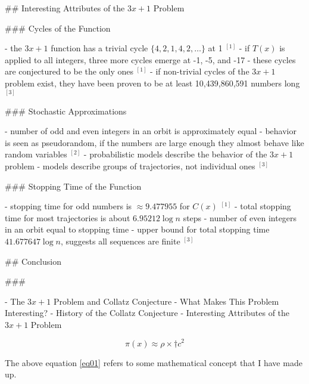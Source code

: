 \documentclass[12pt, a4paper, reqno]{amsart}
\begin{document}
## Interesting Attributes of the $3x+1$ Problem

### Cycles of the Function

- the $3x+1$ function has a trivial cycle $\{4,2,1,4,2,\dots\}$ at 1 $^{[1]}$
- if $T(x)$ is applied to all integers, three more cycles emerge at -1, -5, and -17
- these cycles are conjectured to be the only ones $^{[1]}$
- if non-trivial cycles of the $3x+1$ problem exist, they have been proven to
be at least 10,439,860,591 numbers long $^{[3]}$

### Stochastic Approximations

- number of odd and even integers in an orbit is approximately equal
- behavior is seen as pseudorandom, if the numbers are large enough they almost
behave like random variables $^{[2]}$
- probabilistic models describe the behavior of the $3x+1$ problem
- models describe groups of trajectories, not individual ones $^{[3]}$

### Stopping Time of the Function

- stopping time for odd numbers is $\approx 9.477955$ for $C(x)$ $^{[1]}$
- total stopping time for most trajectories is about $6.95212 \log n$ steps
- number of even integers in an orbit equal to stopping time
- upper bound for total stopping time $41.677647 \log n$, suggests all
sequences are finite $^{[3]}$

## Conclusion

###

- The $3x+1$ Problem and Collatz Conjecture
- What Makes This Problem Interesting?
- History of the Collatz Conjecture
- Interesting Attributes of the $3x+1$ Problem




\begin{equation}
    \pi(x) \approx \rho \times \dagger c^2 \label{eq01}
\end{equation}

The above equation \eqref{eq01} refers to some mathematical concept that
I have made up.
\end{document}
